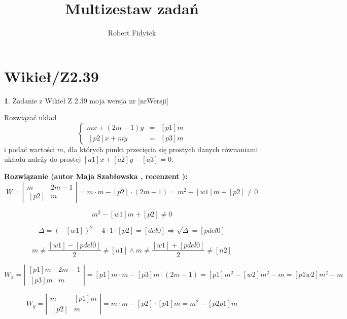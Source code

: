 \documentclass[12pt, a4paper]{article}
\title{Multizestaw zadań}
\author{Robert Fidytek}
\date{}
\theoremstyle{definition} %
\newtheorem{zad}{}
\newcommand{\kategoria}[1]{\section{#1}} %
\newcommand{\zadStart}[1]{\begin{zad}#1\newline} %
\newcommand{\zadStop}{\end{zad}}   %
\newcommand{\rozwStart}[2]{\noindent \textbf{Rozwiązanie (autor #1 , recenzent #2): }\newline} %
\begin{document}
\maketitle


\kategoria{Wikieł/Z2.39}
\zadStart{Zadanie z Wikieł Z 2.39  moja wersja nr [nrWersji]}



Rozwiązać układ
$$\left\{\begin{array}{rcl}
mx+(2m-1)y&=&[p1]m\\
\ [p2]x+my&=&[p3]m
\end{array} \right.$$
i podać wartości $m$, dla których punkt przecięcia się prostych danych równaniami układu należy do prostej $[a1]x+[a2]y-[a3]=0$.
\zadStop
\rozwStart{Maja Szabłowska}{}
$$W=\left| \begin{array}{lccr} m & 2m-1 \\ \ [p2] & m \end{array}\right| = m\cdot m - [p2]\cdot (2m-1)=m^{2}-[w1]m+[p2] \neq 0$$

$$m^{2}-[w1]m+[p2] \neq 0 $$

$$\Delta=(-[w1])^{2}-4\cdot 1 \cdot [p2]=[del0] \Rightarrow \sqrt{\Delta}=[pdel0]$$

$$m\neq \frac{[w1]-[pdel0]}{2}\neq [n1] \land m\neq \frac{[w1]+[pdel0]}{2} \neq [n2]$$

$$W_{x}=\left| \begin{array}{lccr} [p1]m & 2m-1 \\ \ [p3]m & m \end{array}\right| = [p1]m\cdot m -[p3]m\cdot(2m-1)=[p1]m^{2}-[w2]m^{2}-m=[p1w2]m^{2}-m$$

$$W_{y}=\left| \begin{array}{lccr} m & [p1]m \\ \ [p2] & m \end{array}\right| = m\cdot m - [p2]\cdot[p1]m=m^{2}-[p2p1]m$$
\end{document}
